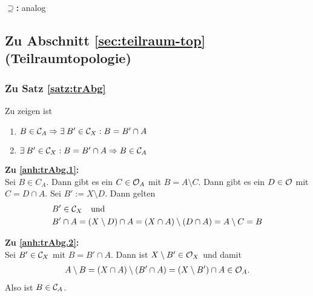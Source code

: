     \noindent
    \textbf{\glqq$\boldsymbol{\supseteq}$\grqq:} analog
    
    
    
    





\subsection{Zu Abschnitt \ref{sec:teilraum-top} (Teilraumtopologie)}



\subsubsection{Zu Satz \ref{satz:trAbg}}\label{anh:trAbg}
Zu zeigen ist
\begin{enumerate}
	\item $B \in \mathcal{C}_A \Rightarrow \exists\: B' \in \mathcal{C}_X : B = B' \cap A$ \label{anh:trAbg.1}
	\item $\exists\: B' \in \mathcal{C}_X : B = B' \cap A \Rightarrow B \in \mathcal{C}_A$ \label{anh:trAbg.2}
\end{enumerate}

\noindent
\textbf{Zu \ref{anh:trAbg.1}:} \\
Sei $B \in C_A$. Dann gibt es ein $C \in \mathcal{O}_A$ mit $B = A \setminus C$. Dann gibt es ein $D \in \mathcal{O}$ mit $C = D \cap A$. Sei $B' := X \setminus D$. Dann gelten 
\begin{align*}
	&B' \in \mathcal{C}_X \quad \textnormal{und} \\
	&B' \cap A = (X \setminus D) \cap A = (X \cap A) \setminus (D \cap A) = A \setminus C = B
\end{align*}

\noindent
\textbf{Zu \ref{anh:trAbg.2}:} \\
Sei $B' \in \mathcal{C}_X$ mit $B = B' \cap A$. Dann ist $X \setminus B' \in \mathcal{O}_X$ und damit 
\begin{align*}
	A \setminus B = (X \cap A) \setminus (B' \cap A) =(X \setminus B') \cap A \in \mathcal{O}_A.
\end{align*}
Also ist $B \in \mathcal{C}_A$. \\


